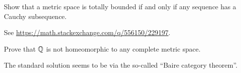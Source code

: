 \begin{problem}
	Show that a metric space is totally bounded
	if and only if any sequence has a Cauchy subsequence.
	\begin{sol}
		See \url{https://math.stackexchange.com/q/556150/229197}.
	\end{sol}
\end{problem}

\begin{problem}
	\threechili
	Prove that $\mathbb Q$ is not homeomorphic to any complete metric space.
	\begin{hint}
		The standard solution seems to be
		via the so-called ``Baire category theorem''.
	\end{hint}
\end{problem}
